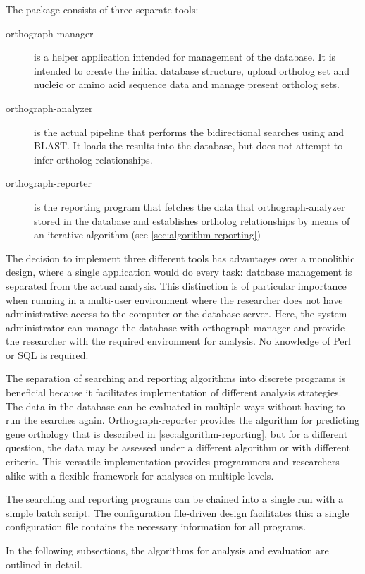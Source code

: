 \label{sec:algorithm}
The \pname package consists of three separate tools:

\begin{description}
	\item[orthograph-manager] is a helper application intended for management of
		the database. It is intended to create the initial database structure, upload
		ortholog set and nucleic or amino acid sequence data and manage present
		ortholog sets.
	\item[orthograph-analyzer] is the actual pipeline that performs the
		bidirectional searches using  and BLAST. It loads the
		results into the database, but does not attempt to infer ortholog
		relationships. 
	\item[orthograph-reporter] is the reporting program that fetches the data that
		orthograph-analyzer stored in the database and establishes ortholog
		relationships by means of an iterative algorithm (see
		\autoref{sec:algorithm-reporting})
\end{description}

The decision to implement three different tools  has advantages over a
monolithic design, where a single application would do every task: database
management is separated from the actual analysis. This distinction is of
particular importance when running \pname in a multi-user environment where the
researcher does not have administrative access to the computer or the database
server. Here, the system administrator can manage the database with
orthograph-manager and provide the researcher with the required environment for
analysis. No knowledge of Perl or SQL is required.

The separation of searching and reporting algorithms into discrete programs is
beneficial because it facilitates implementation of different analysis
strategies. The data in the database can be evaluated in multiple ways without
having to run the searches again. Orthograph-reporter provides the algorithm for
predicting gene orthology that is described in
\autoref{sec:algorithm-reporting}, but for a different question, the data may be
assessed under a different algorithm or with different criteria. This versatile
implementation provides programmers and researchers alike with a flexible
framework for analyses on multiple levels. 

The searching and reporting programs can be chained into a single run with a
simple batch script. The configuration file-driven design facilitates this: a
single configuration file contains the necessary information for all \pname
programs.

In the following subsections, the algorithms for analysis and evaluation are
outlined in detail.
